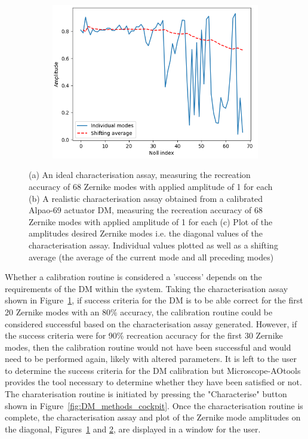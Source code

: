 \begin{figure}[h]
\begin{subfigure}{0.45\textwidth}
		\caption{}
		\label{fig:characterisation_assay_real}
	\end{subfigure}
	\begin{subfigure}{0.9\textwidth}
		\centering
		\includegraphics[width=0.5\linewidth, scale=0.5]{./images/characterisation_assay_real_diag_and_avg.png}
		\caption{}
		\label{fig:characterisation_assay_ideal_diag_and_avg}
	\end{subfigure}
	\caption{(a) An ideal characterisation assay, measuring the recreation accuracy of 68 Zernike modes with applied amplitude of 1 for each (b) A realistic characterisation assay obtained from a calibrated Alpao-69 actuator DM, measuring the recreation accuracy of 68 Zernike modes with applied amplitude of 1 for each (c) Plot of the amplitudes desired Zernike modes i.e. the diagonal values of the characterisation assay. Individual values plotted as well as a shifting average (the average of the current mode and all preceding modes)}
	\label{fig:characterisation_assay_results}
\end{figure}

Whether a calibration routine is considered a 'success' depends on the requirements of the DM within the system. Taking the characterisation assay shown in Figure~\ref{fig:characterisation_assay_real}, if success criteria for the DM is to be able correct for the first 20 Zernike modes with an 80\% accuracy, the calibration routine could be considered successful based on the characterisation assay generated. However, if the success criteria were for 90\% recreation accuracy for the first 30 Zernike modes, then the calibration routine would not have been successful and would need to be performed again, likely with altered parameters. It is left to the user to determine the success criteria for the DM calibration but Microscope-AOtools provides the tool necessary to determine whether they have been satisfied or not. The charaterisation routine is initiated by pressing the "Characterise" button shown in Figure~\ref{fig:DM_methods_cockpit}. Once the characterisation routine is complete, the characterisation assay and plot of the Zernike mode amplitudes on the diagonal, Figures~\ref{fig:characterisation_assay_real} and \ref{fig:characterisation_assay_ideal_diag_and_avg}, are displayed in a window for the user.

